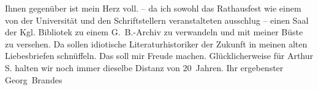 \begin{ledgroupsized}[t]{13cm}
           \pstart
           Ihnen gegenüber ist mein Herz voll. \label{K_L02051-1v}\label{K_L02051-1h} – da ich sowohl das Rathausfest wie einem von
               der Universität und den Schriftstellern veranstalteten ausschlug – einen Saal der Kgl. Bibliotek zu einem G. B.-Archiv zu verwandeln und mit meiner Büste zu versehen.\pend
           \pstart
           Da sollen idiotische Literaturhistoriker der Zukunft in meinen alten Liebesbriefen
               schnüffeln. Das soll mir Freude machen.\pend
           \pstart
           Glücklicherweise für Arthur S. halten wir noch immer dieselbe Distanz von
               20 Jahren.\pend
           \pstart Ihr ergebenster \spacefill\mbox{Georg Brandes}\pend{}
         
         \endnumbering{}\end{ledgroupsized}  \newcommand{\dateiname}{L02051}\newcommand{\titel}{Georg Brandes an Arthur und Olga Schnitzler, 3. 2. 1912}\newcommand{\editorInnen}{Martin Anton Müller und Gerd-Hermann Susen}
      